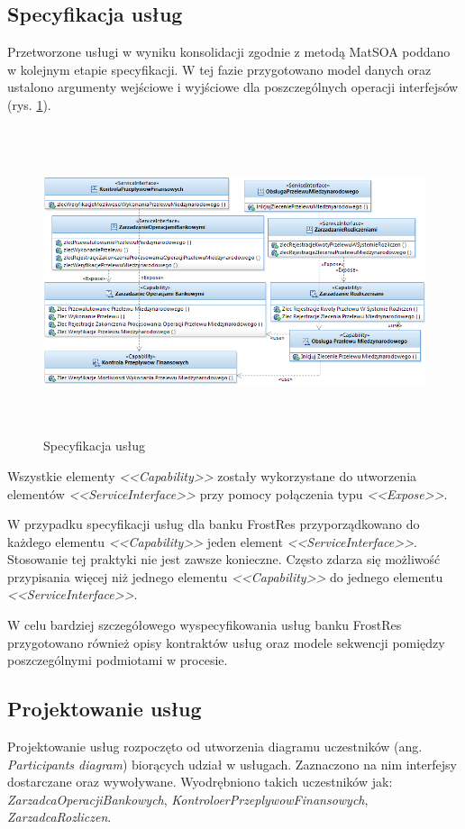\subsection{Specyfikacja usług}
Przetworzone usługi w wyniku konsolidacji zgodnie z metodą MatSOA poddano w kolejnym etapie specyfikacji. W tej fazie przygotowano model danych oraz ustalono argumenty wejściowe i wyjściowe dla poszczególnych operacji interfejsów (rys. \ref{services_specification}).

\begin{figure}[h!tbp]
\begin{centering}
\includegraphics[width=16cm, height=9cm]{img/services_specification_model.png}
\caption[Specyfikacja usług]{Specyfikacja usług}\label{services_specification}
\end{centering}
\end{figure}

Wszystkie elementy \emph{<<Capability>>} zostały wykorzystane do utworzenia elementów \emph{<<ServiceInterface>>} przy pomocy połączenia typu \emph{<<Expose>>}. 

W przypadku specyfikacji usług dla banku FrostRes przyporządkowano do każdego elementu \emph{<<Capability>>} jeden element \emph{<<ServiceInterface>>}. Stosowanie tej praktyki nie jest zawsze konieczne. Często zdarza się możliwość przypisania więcej niż jednego elementu \emph{<<Capability>>} do jednego elementu \emph{<<ServiceInterface>>}. 

W celu bardziej szczegółowego wyspecyfikowania usług banku FrostRes przygotowano również opisy kontraktów usług oraz modele sekwencji pomiędzy poszczególnymi podmiotami w procesie. 

\subsection{Projektowanie usług}
Projektowanie usług rozpoczęto od utworzenia diagramu uczestników (ang. \emph{Participants diagram}) biorących udział w usługach. Zaznaczono na nim interfejsy dostarczane oraz wywoływane. Wyodrębniono takich uczestników jak: \emph{ZarzadcaOperacjiBankowych}, \emph{KontroloerPrzeplywowFinansowych}, \emph{ZarzadcaRozliczen}.

